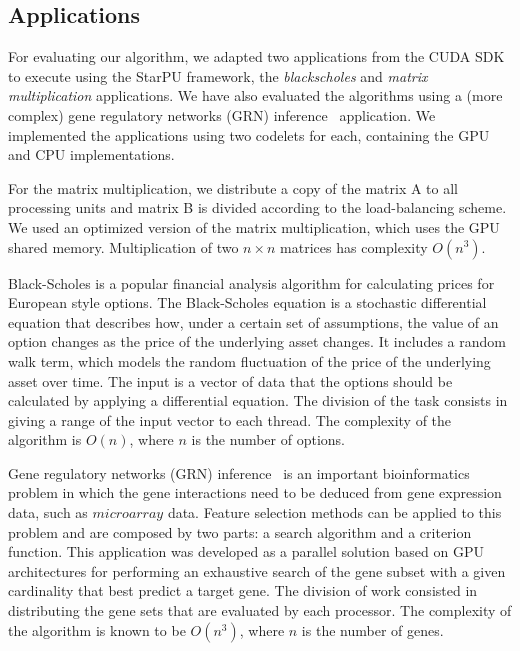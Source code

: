 \documentclass[journal]{IEEEtran}
\begin{document}
\subsection{Applications}

For evaluating our algorithm, we adapted two applications from the CUDA
SDK~\cite{cuda} to execute using the StarPU framework, the \emph{blackscholes}
and \emph{matrix multiplication} applications. We have also evaluated the
algorithms using a (more complex) gene regulatory networks (GRN)
inference~\cite{borelli2013gene} application. We implemented the applications
using two codelets for each, containing the GPU and CPU implementations.

For the matrix multiplication, we distribute a copy of the matrix A to all
processing units and matrix B is divided according to the load-balancing scheme.
We used an optimized version of the matrix multiplication, which uses the GPU
shared memory. Multiplication of two $n \times n$ matrices has complexity
$O(n^3)$.

Black-Scholes is a popular financial analysis algorithm for calculating prices
for European style options. The Black-Scholes equation is a stochastic
differential equation that describes how, under a certain set of assumptions,
the value of an option changes as the price of the underlying asset changes. It
includes a random walk term, which models the random fluctuation of the price of
the underlying asset over time. The input is a vector of data that the options
should be calculated by applying a differential equation. The division of the
task consists in giving a range of the input vector to each thread. The
complexity of the algorithm is $O(n)$, where $n$ is the number of options.



Gene regulatory networks (GRN) inference~\cite{borelli2013gene} is an important
bioinformatics problem in which the gene interactions need to be deduced from
gene expression data, such as $microarray$ data. Feature selection methods can
be applied to this problem and are composed by two parts: a search algorithm and
a criterion function. This application was developed as a parallel solution
based on GPU architectures for performing an exhaustive search of the gene
subset with a given cardinality that best predict a target gene. The division of
work consisted in distributing the gene sets that are evaluated by each
processor. The complexity of the algorithm is known to be $O(n^3)$, where $n$ is
the number of genes.
\end{document}
